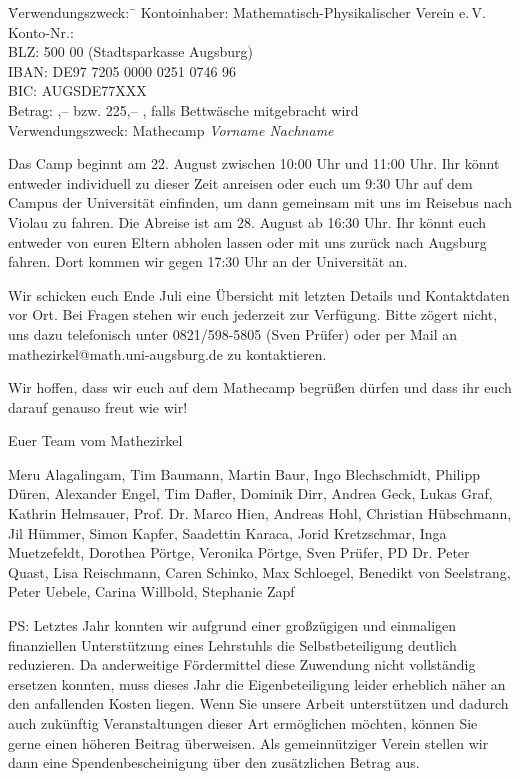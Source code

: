\documentclass[12pt]{zettel}
\begin{document}
\vspace{-0.7em}
\begin{tabbing}
  \qquad\quad \= Verwendungszweck:\, \= \kill
  \> Kontoinhaber: \> Mathematisch-Physikalischer Verein e.\,V. \\
  \> Konto-Nr.:  \\
  \> BLZ:  500 00 (Stadtsparkasse Augsburg) \\
  \> IBAN: \> DE97 7205 0000 0251 0746 96 \\
  \> BIC: \> AUGSDE77XXX \\
  \> Betrag: ,-- \texteuro{} bzw. 225,-- \texteuro, falls Bettwäsche
  mitgebracht wird \\
  \> Verwendungszweck: \> Mathecamp \emph{Vorname Nachname}
\end{tabbing}
\vspace{-0.7em}

Das Camp beginnt am 22. August zwischen 10:00 Uhr und 11:00 Uhr. Ihr könnt
entweder individuell zu dieser Zeit anreisen oder euch um 9:30 Uhr auf dem Campus der
Universität einfinden, um dann gemeinsam mit uns im Reisebus nach Violau zu fahren.
Die Abreise ist am 28. August ab 16:30 Uhr. Ihr könnt euch entweder von euren
Eltern abholen lassen oder mit uns zurück nach Augsburg fahren. Dort kommen wir
gegen 17:30 Uhr an der Universität an.

Wir schicken euch Ende Juli eine Übersicht mit
letzten Details und Kontaktdaten vor Ort. Bei Fragen stehen wir euch jederzeit
zur Verfügung. Bitte zögert nicht, uns dazu telefonisch unter 0821/598-5805
(Sven Prüfer) oder per Mail an \textsf{mathezirkel@math.uni-augsburg.de} zu kontaktieren.

Wir hoffen, dass wir
euch auf dem Mathecamp begrüßen dürfen und dass
ihr euch darauf genauso freut wie wir!

\vspace{2em}

Euer Team vom Mathezirkel

{\small Meru Alagalingam, Tim Baumann, Martin Baur, Ingo Blechschmidt, Philipp
Düren, Alexander Engel, Tim Dafler, Dominik Dirr, Andrea Geck, Lukas Graf,
Kathrin Helmsauer, Prof. Dr. Marco Hien, Andreas Hohl, Christian Hübschmann,
Jil Hümmer, Simon Kapfer, Saadettin Karaca, Jorid Kretzschmar, Inga
Muetzefeldt, Dorothea Pörtge, Veronika Pörtge, Sven Prüfer, PD Dr. Peter Quast,
Lisa Reischmann, Caren Schinko, Max Schloegel, Benedikt von Seelstrang, Peter
Uebele, Carina Willbold, Stephanie Zapf}

\vfill

PS: Letztes Jahr konnten wir aufgrund einer großzügigen und einmaligen
finanziellen Unterstützung eines Lehrstuhls die Selbstbeteiligung deutlich
reduzieren. Da anderweitige Fördermittel diese Zuwendung nicht vollständig
ersetzen konnten, muss dieses Jahr die Eigenbeteiligung leider erheblich näher
an den anfallenden Kosten
liegen. Wenn Sie unsere Arbeit unterstützen
und dadurch auch zukünftig Veranstaltungen dieser Art ermöglichen möchten,
können Sie gerne einen höheren Beitrag überweisen. Als gemeinnütziger Verein
stellen wir dann eine Spendenbescheinigung über den zusätzlichen
Betrag aus.
\end{document}
